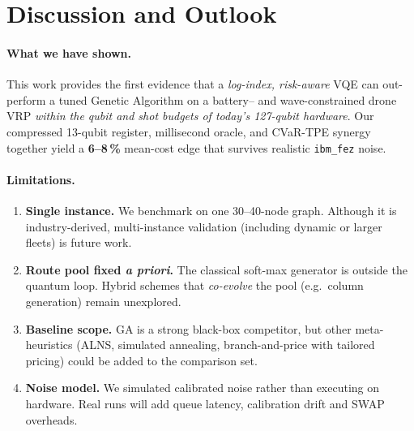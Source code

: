 \section{Discussion and Outlook}
\label{sec:discussion}

\paragraph{What we have shown.}
This work provides the first evidence that a \emph{log-index, risk-aware}
VQE can out-perform a tuned Genetic Algorithm on a
battery– and wave-constrained drone VRP
\emph{within the qubit and shot budgets of today’s 127-qubit hardware}.
Our compressed 13-qubit register, millisecond oracle,
and CVaR-TPE synergy together yield a \textbf{6–8\,\%} mean-cost edge
that survives realistic \texttt{ibm\_fez} noise.

\paragraph{Limitations.}
\begin{enumerate}[nosep,leftmargin=*]
\item \textbf{Single instance.}  We benchmark on one 30–40-node graph.
      Although it is industry-derived, multi-instance validation
      (including dynamic or larger fleets) is future work.
\item \textbf{Route pool fixed \emph{a priori}.}
      The classical soft-max generator is outside the quantum loop.
      Hybrid schemes that \emph{co-evolve} the pool (e.g.\ column
      generation) remain unexplored.
\item \textbf{Baseline scope.}  GA is a strong black-box competitor,
      but other meta-heuristics (ALNS, simulated annealing, branch-and-price
      with tailored pricing) could be added to the comparison set.
\item \textbf{Noise model.}  We simulated calibrated noise rather than
      executing on hardware.  Real runs will add queue latency,
      calibration drift and SWAP overheads.
\end{enumerate}

